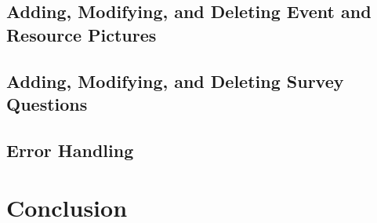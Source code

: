 \documentclass[onecolumn, draftclsnofoot,10pt, compsoc]{IEEEtran}
\begin{document}
  \subsection{Adding, Modifying, and Deleting Event and Resource Pictures}

  \subsection{Adding, Modifying, and Deleting Survey Questions}

  \subsection{Error Handling}


\section{Conclusion}
\end{document}

